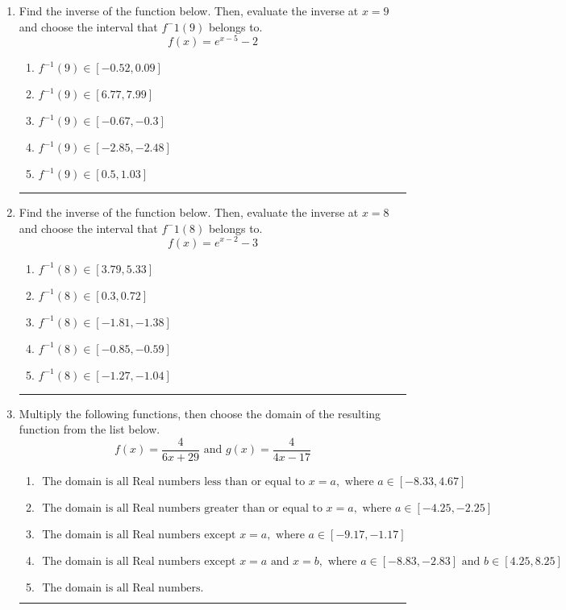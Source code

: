 \documentclass[14pt]{extbook}
\newcommand{\litem}[1]{\item#1\hspace*{-1cm}\rule{\textwidth}{0.4pt}}
\begin{document}
\begin{enumerate}
{\begin{enumerate}[label=\Alph*.]
\end{enumerate} }
\litem{
Find the inverse of the function below. Then, evaluate the inverse at $x = 9$ and choose the interval that $f^-1(9)$ belongs to.\[ f(x) = e^{x-5}-2 \]\begin{enumerate}[label=\Alph*.]
\item \( f^{-1}(9) \in [-0.52, 0.09] \)
\item \( f^{-1}(9) \in [6.77, 7.99] \)
\item \( f^{-1}(9) \in [-0.67, -0.3] \)
\item \( f^{-1}(9) \in [-2.85, -2.48] \)
\item \( f^{-1}(9) \in [0.5, 1.03] \)

\end{enumerate} }
\litem{
Find the inverse of the function below. Then, evaluate the inverse at $x = 8$ and choose the interval that $f^-1(8)$ belongs to.\[ f(x) = e^{x-2}-3 \]\begin{enumerate}[label=\Alph*.]
\item \( f^{-1}(8) \in [3.79, 5.33] \)
\item \( f^{-1}(8) \in [0.3, 0.72] \)
\item \( f^{-1}(8) \in [-1.81, -1.38] \)
\item \( f^{-1}(8) \in [-0.85, -0.59] \)
\item \( f^{-1}(8) \in [-1.27, -1.04] \)

\end{enumerate} }
\litem{
Multiply the following functions, then choose the domain of the resulting function from the list below.\[ f(x) = \frac{4}{6x+29} \text{ and } g(x) = \frac{4}{4x-17} \]\begin{enumerate}[label=\Alph*.]
\item \( \text{ The domain is all Real numbers less than or equal to } x = a, \text{ where } a \in [-8.33, 4.67] \)
\item \( \text{ The domain is all Real numbers greater than or equal to } x = a, \text{ where } a \in [-4.25, -2.25] \)
\item \( \text{ The domain is all Real numbers except } x = a, \text{ where } a \in [-9.17, -1.17] \)
\item \( \text{ The domain is all Real numbers except } x = a \text{ and } x = b, \text{ where } a \in [-8.83, -2.83] \text{ and } b \in [4.25, 8.25] \)
\item \( \text{ The domain is all Real numbers. } \)


\end{enumerate}}
\end{enumerate}
\end{document}
